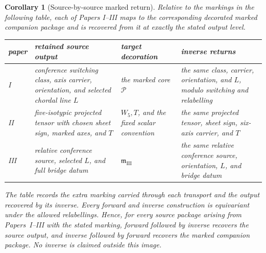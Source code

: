 \documentclass[11pt]{article}
\newtheorem{corollary}[theorem]{Corollary}
\theoremstyle{definition}
\theoremstyle{remark}
\begin{document}
\begin{corollary}[Source-by-source marked return]
\label{cor:source-by-source-return}
Relative to the markings in the following table, each of Papers I--III maps
to the corresponding decorated marked companion package and is recovered
from it at exactly the stated output level.

\begin{center}
\small
\renewcommand{\arraystretch}{1.15}
\begin{tabular}{@{}>{\centering\arraybackslash}p{}
  >{\raggedright\arraybackslash}p{}
  >{\raggedright\arraybackslash}p{}
  >{\raggedright\arraybackslash}p{}@{}}
\toprule
paper & retained source output & target decoration & inverse returns\\
\midrule
I & conference switching class, axis carrier, orientation, and selected
  chordal line \(L\) & the marked core \(\mathcal P\) & the same class,
  carrier, orientation, and \(L\), modulo switching and relabelling\\
II & five-isotypic projected tensor with chosen sheet sign, marked axes, and
  \(T\) & \(W_5,T\), and the fixed scalar convention & the same projected
  tensor, sheet sign, six-axis carrier, and \(T\)\\
III & relative conference source, selected \(L\), and full bridge datum &
  \(\mathfrak m_{\mathrm{III}}\) & the same relative conference source,
  orientation, \(L\), and bridge datum\\
\bottomrule
\end{tabular}
\end{center}

The table records the extra marking carried through each transport and the
output recovered by its inverse.  Every forward and inverse construction is
equivariant under the allowed relabellings.  Hence, for every source package
arising from Papers~I--III with the stated marking, forward followed by
inverse recovers the source output, and inverse followed by forward recovers
the marked companion package.  No inverse is claimed outside this image.
\end{corollary}
\end{document}
